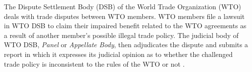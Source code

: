 The Dispute Settlement Body (DSB) of
the World Trade Organization (WTO) deals
with trade disputes between WTO members.
WTO members file a lawsuit in WTO DSB to
claim their impaired benefit related to the WTO agreements as a result of another member's possible illegal trade policy.
The judicial body of WTO DSB, \textit{Panel} or \textit{Appellate Body}, then adjudicates the dispute and submits a report in which it expresses
its judicial opinion as to whether the challenged
trade policy is inconsistent to the rules of the WTO or not \citep{world2017handbook}.

